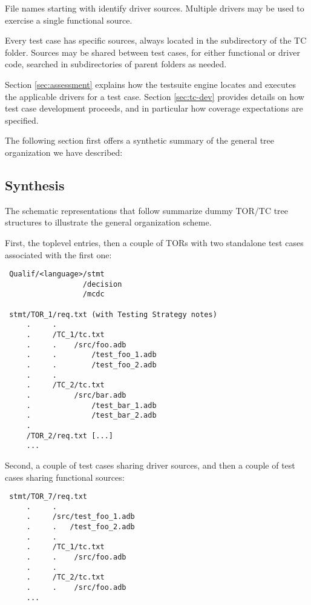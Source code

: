 \documentclass {report}
\begin{document}
File names starting with  identify driver sources. Multiple drivers
may be used to exercise a single functional source.

Every test case has specific sources, always located in the 
subdirectory of the TC folder.
%
Sources may be shared between test cases, for either functional or driver
code, searched in  subdirectories of parent folders as needed.

Section \ref{sec:assessment} explains how the testsuite engine
locates and executes the applicable drivers for a test case.
%
Section \ref{sec:tc-dev} provides details on how test case development
proceeds, and in particular how coverage expectations are specified.

The following section first offers a synthetic summary of the general
tree organization we have described:

\subsection{Synthesis}

The schematic representations that follow summarize dummy TOR/TC tree
structures to illustrate the general organization scheme.

First, the toplevel entries, then a couple of TORs with two standalone test
cases associated with the first one:

\begin{verbatim}
 Qualif/<language>/stmt
                  /decision
                  /mcdc

 stmt/TOR_1/req.txt (with Testing Strategy notes)
     .     .
     .     /TC_1/tc.txt
     .     .    /src/foo.adb
     .     .        /test_foo_1.adb
     .     .        /test_foo_2.adb
     .     .
     .     /TC_2/tc.txt
     .          /src/bar.adb
     .              /test_bar_1.adb
     .              /test_bar_2.adb
     .
     /TOR_2/req.txt [...]
     ...
\end{verbatim}


Second, a couple of test cases sharing driver sources, and then a couple of
test cases sharing functional sources:

\begin{verbatim}
 stmt/TOR_7/req.txt 
     .     .
     .     /src/test_foo_1.adb
     .     .   /test_foo_2.adb
     .     .
     .     /TC_1/tc.txt
     .     .    /src/foo.adb
     .     .
     .     /TC_2/tc.txt
     .     .    /src/foo.adb
     ...
\end{verbatim}
\end{document}
